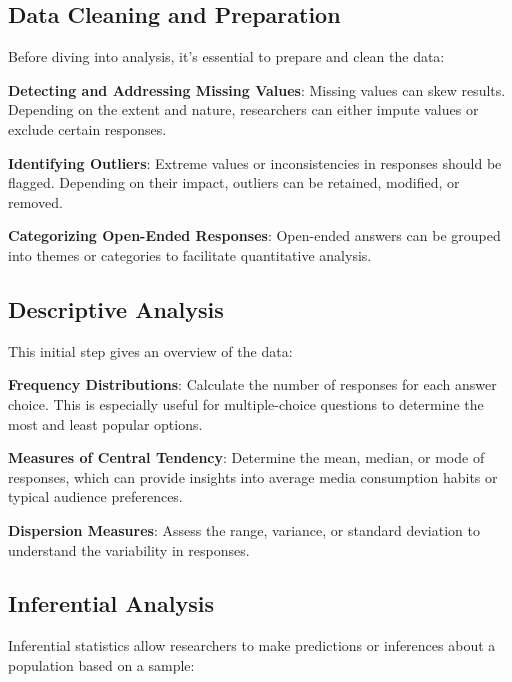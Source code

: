 \documentclass[
  b5paper]{book}
\begin{document}
\hypertarget{data-cleaning-and-preparation}{%
\subsection*{Data Cleaning and Preparation}\label{data-cleaning-and-preparation}}

Before diving into analysis, it's essential to prepare and clean the data:

\textbf{Detecting and Addressing Missing Values}: Missing values can skew results.
Depending on the extent and nature, researchers can either impute values or exclude certain responses.

\textbf{Identifying Outliers}: Extreme values or inconsistencies in responses should be flagged.
Depending on their impact, outliers can be retained, modified, or removed.

\textbf{Categorizing Open-Ended Responses}: Open-ended answers can be grouped into themes or categories to facilitate quantitative analysis.

\hypertarget{descriptive-analysis}{%
\subsection*{Descriptive Analysis}\label{descriptive-analysis}}

This initial step gives an overview of the data:

\textbf{Frequency Distributions}: Calculate the number of responses for each answer choice.
This is especially useful for multiple-choice questions to determine the most and least popular options.

\textbf{Measures of Central Tendency}: Determine the mean, median, or mode of responses, which can provide insights into average media consumption habits or typical audience preferences.

\textbf{Dispersion Measures}: Assess the range, variance, or standard deviation to understand the variability in responses.

\hypertarget{inferential-analysis}{%
\subsection*{Inferential Analysis}\label{inferential-analysis}}

Inferential statistics allow researchers to make predictions or inferences about a population based on a sample:
\end{document}
